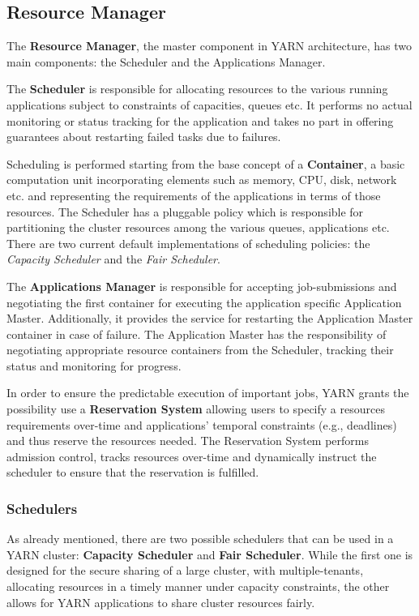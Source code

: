 \subsection{Resource Manager}

The \textbf{Resource Manager}, the master component in YARN architecture, has two main components: the Scheduler and the Applications Manager.

The \textbf{Scheduler} is responsible for allocating resources to the various running applications subject to constraints of capacities, queues etc. It performs no actual monitoring or status tracking for the application and takes no part in offering guarantees about restarting failed tasks due to failures. 

Scheduling is performed starting from the base concept of a \textbf{Container}, a basic computation unit incorporating elements such as memory, CPU, disk, network etc. and representing the requirements of the applications in terms of those resources. The Scheduler has a pluggable policy which is responsible for partitioning the cluster resources among the various queues, applications etc. There are two current default implementations of scheduling policies: the \textit{Capacity Scheduler} and the \textit{Fair Scheduler}.

The \textbf{Applications Manager} is responsible for accepting job-submissions and negotiating the first container for executing the application specific Application Master. Additionally, it provides the service for restarting the Application Master container in case of failure. The Application Master has the responsibility of negotiating appropriate resource containers from the Scheduler, tracking their status and monitoring for progress.

In order to ensure the predictable execution of important jobs, YARN grants the possibility use a \textbf{Reservation System} allowing users to specify a resources requirements over-time and applications' temporal constraints (e.g., deadlines) and thus reserve the resources needed. The Reservation System  performs admission control, tracks resources over-time and dynamically instruct the scheduler to ensure that the reservation is fulfilled.

\subsubsection{Schedulers}

As already mentioned, there are two possible schedulers that can be used in a YARN cluster: \textbf{Capacity Scheduler} and \textbf{Fair Scheduler}. While the first one is designed for the secure sharing of a large cluster, with multiple-tenants, allocating resources in a timely manner under capacity constraints, the other allows for YARN applications to share cluster resources fairly.

